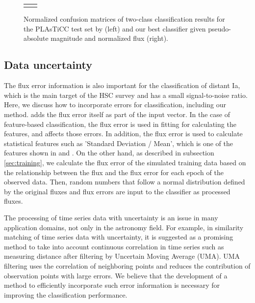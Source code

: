 \documentclass[useamsfonts]{pasj01}
\begin{document}
\begin{figure}[htbp]
\begin{tabular}{cc}
\begin{minipage}{0.5\hsize}
\begin{center}
            \end{center}
        \end{minipage}
    \end{tabular}  \caption{%
    Normalized confusion matrices of two-class classification results for the PLAsTiCC test set by \citet{boone19a} (left) and our best classifier given pseudo-absolute magnitude and normalized flux (right).
    }%
    \label{fig:comp_plasticc_1st}
\end{figure}
%
%
%
%
\subsection{Data uncertainty}
%
The flux error information is also important for the classification of distant Ia, which is the main target of the HSC survey and has a small signal-to-noise ratio.
Here, we discuss how to incorporate errors for classification, including our method.
\citet{charnock17a} adds the flux error itself as part of the input vector.
In the case of feature-based classification, the flux error is used in fitting for calculating the features, and affects those errors.
In addition, the flux error is used to calculate statistical features such as 'Standard Deviation / Mean', which is one of the features shown in \citet{narayan18a} and \citet{Muthukrishna_2019}.
On the other hand, as described in subsection \ref{sec:training}, we calculate the flux error of the simulated training data based on the relationship between the flux and the flux error for each epoch of the observed data.
Then, random numbers that follow a normal distribution defined by the original fluxes and flux errors are input to the classifier as processed fluxes.

The processing of time series data with uncertainty is an issue in many application domains, not only in the astronomy field.
For example, in similarity matching of time series data with uncertainty, it is suggested as a promising method to take into account continuous correlation in time series such as measuring distance after filtering by Uncertain Moving Average (UMA)\citep{Dallachiesa_2012}.
UMA filtering uses the correlation of neighboring points and reduces the contribution of observation points with large errors.
We believe that the development of a method to efficiently incorporate such error information is necessary for improving the classification performance.
%
\end{document}
